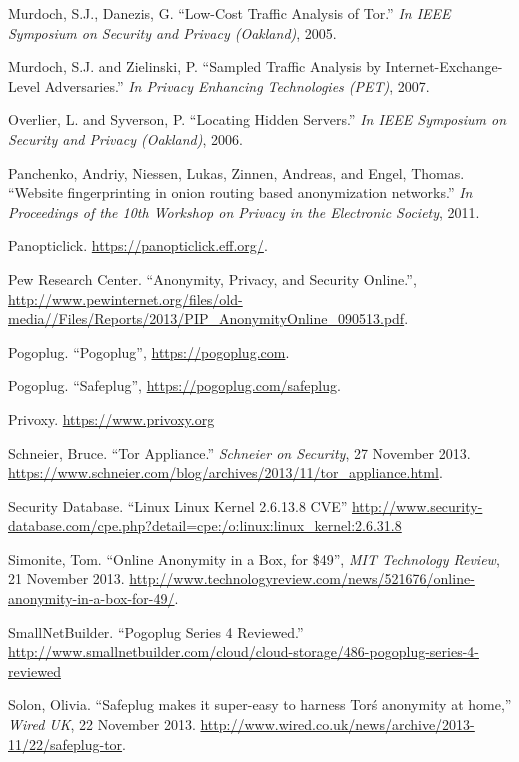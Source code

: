 \documentclass[conference]{IEEEtran}
\begin{document}
\begin{thebibliography}{1}
 Murdoch, S.J., Danezis, G.  ``Low-Cost Traffic Analysis of Tor.'' \emph{In IEEE Symposium on Security and Privacy (Oakland)}, 2005.

 Murdoch, S.J. and Zielinski, P.  ``Sampled Traffic Analysis by Internet-Exchange-Level Adversaries.'' \emph{In Privacy Enhancing Technologies (PET)}, 2007.

 Overlier, L. and Syverson, P.  ``Locating Hidden Servers.'' \emph{In IEEE Symposium on Security and Privacy (Oakland)}, 2006.

 Panchenko, Andriy, Niessen, Lukas, Zinnen, Andreas, and Engel, Thomas.  ``Website fingerprinting in onion routing based anonymization networks.'' \emph{In Proceedings of the 10th Workshop on Privacy in the Electronic Society}, 2011.

 Panopticlick. \url{https://panopticlick.eff.org/}.

 Pew Research Center.  ``Anonymity, Privacy, and Security Online.'', \url{http://www.pewinternet.org/files/old-media//Files/Reports/2013/PIP_AnonymityOnline_090513.pdf}.

 Pogoplug. ``Pogoplug'', \url{https://pogoplug.com}.

 Pogoplug. ``Safeplug'', \url{https://pogoplug.com/safeplug}.

 Privoxy. \url{https://www.privoxy.org}

 Schneier, Bruce. ``Tor Appliance.'' \emph{Schneier on Security}, 27 November 2013. \url{https://www.schneier.com/blog/archives/2013/11/tor_appliance.html}.

 Security Database. ``Linux Linux Kernel 2.6.13.8 CVE'' \url{http://www.security-database.com/cpe.php?detail=cpe:/o:linux:linux_kernel:2.6.31.8}

 Simonite, Tom. ``Online Anonymity in a Box, for \$49'', \emph{MIT Technology Review}, 21 November 2013. \url{http://www.technologyreview.com/news/521676/online-anonymity-in-a-box-for-49/}.

 SmallNetBuilder. ``Pogoplug Series 4 Reviewed.'' \url{http://www.smallnetbuilder.com/cloud/cloud-storage/486-pogoplug-series-4-reviewed}

 Solon, Olivia. ``Safeplug makes it super-easy to harness Tor\'s anonymity at home,'' \emph{Wired UK}, 22 November 2013. \url{http://www.wired.co.uk/news/archive/2013-11/22/safeplug-tor}.


\end{thebibliography}
\end{document}
